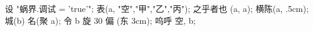 \usemodule[zhfonts]


设 "蜗界.调试 = 'true'";
表(a, "空","甲","乙","丙"); 
之乎者也 (a, a); 横陈(a, .5cm); 
城(b) 名(聚 a); 
令 b 旋 30 偏 (东 3cm); 
呜呼 空, b;
\stopuseMPgraphic

\startTEXpage[offset=4pt]
\stopTEXpage
